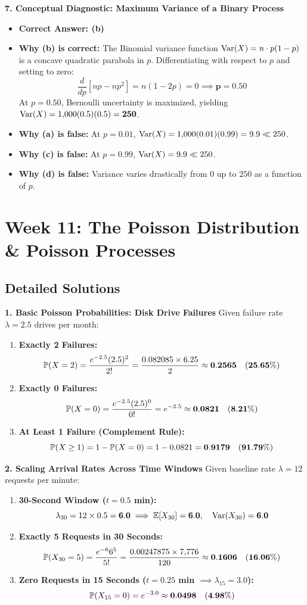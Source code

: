 \textbf{7. Conceptual Diagnostic: Maximum Variance of a Binary Process}
\begin{itemize}
    \item \textbf{Correct Answer: (b)}
    \item \textbf{Why (b) is correct:} The Binomial variance function $\Var(X) = n \cdot p(1 - p)$ is a concave quadratic parabola in $p$. Differentiating with respect to $p$ and setting to zero:
    $$\frac{d}{dp}[np - np^2] = n(1 - 2p) = 0 \implies \mathbf{p = 0.50}$$
    At $p = 0.50$, Bernoulli uncertainty is maximized, yielding $\Var(X) = 1{,}000(0.5)(0.5) = \mathbf{250}$.
    \item \textbf{Why (a) is false:} At $p = 0.01$, $\Var(X) = 1{,}000(0.01)(0.99) = 9.9 \ll 250$.
    \item \textbf{Why (c) is false:} At $p = 0.99$, $\Var(X) = 9.9 \ll 250$.
    \item \textbf{Why (d) is false:} Variance varies drastically from $0$ up to $250$ as a function of $p$.
\end{itemize}


\section*{Week 11: The Poisson Distribution \& Poisson Processes}

\subsection*{Detailed Solutions}

\textbf{1. Basic Poisson Probabilities: Disk Drive Failures}
Given failure rate $\lambda = 2.5$ drives per month:
\begin{enumerate}
    \item \textbf{Exactly 2 Failures:}
    $$\P(X = 2) = \frac{e^{-2.5} (2.5)^2}{2!} = \frac{0.082085 \times 6.25}{2} \approx \mathbf{0.2565 \quad (25.65\%)}$$
    \item \textbf{Exactly 0 Failures:}
    $$\P(X = 0) = \frac{e^{-2.5} (2.5)^0}{0!} = e^{-2.5} \approx \mathbf{0.0821 \quad (8.21\%)}$$
    \item \textbf{At Least 1 Failure (Complement Rule):}
    $$\P(X \ge 1) = 1 - \P(X = 0) = 1 - 0.0821 = \mathbf{0.9179 \quad (91.79\%)}$$
\end{enumerate}

\textbf{2. Scaling Arrival Rates Across Time Windows}
Given baseline rate $\lambda = 12$ requests per minute:
\begin{enumerate}
    \item \textbf{30-Second Window ($t = 0.5$ min):}
    $$\lambda_{30} = 12 \times 0.5 = \mathbf{6.0} \implies \E[X_{30}] = \mathbf{6.0}, \quad \Var(X_{30}) = \mathbf{6.0}$$
    \item \textbf{Exactly 5 Requests in 30 Seconds:}
    $$\P(X_{30} = 5) = \frac{e^{-6} 6^5}{5!} = \frac{0.00247875 \times 7{,}776}{120} \approx \mathbf{0.1606 \quad (16.06\%)}$$
    \item \textbf{Zero Requests in 15 Seconds ($t = 0.25$ min $\implies \lambda_{15} = 3.0$):}
    $$\P(X_{15} = 0) = e^{-3.0} \approx \mathbf{0.0498 \quad (4.98\%)}$$
\end{enumerate}

